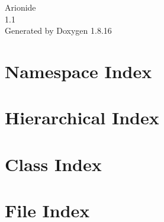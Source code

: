 \let\mypdfximage\pdfximage\def\pdfximage{\immediate\mypdfximage}\documentclass[twoside]{book}
\newcommand{\+}{\discretionary{\mbox{\scriptsize$\hookleftarrow$}}{}{}}
\newcommand{\clearemptydoublepage}{%
  \newpage{\pagestyle{empty}\cleardoublepage}%
}
\begin{document}
\hypersetup{pageanchor=false,
             bookmarksnumbered=true,
             pdfencoding=unicode
            }
\begin{titlepage}
\vspace*{7cm}
\begin{center}%
{\Large Arionide \\[1ex]\large 1.\+1 }\\
\vspace*{1cm}
{\large Generated by Doxygen 1.8.16}\\
\end{center}
\end{titlepage}
\clearemptydoublepage
{}
\tableofcontents
\clearemptydoublepage
{}
\hypersetup{pageanchor=true}

\chapter{Namespace Index}

\chapter{Hierarchical Index}

\chapter{Class Index}

\chapter{File Index}

\end{document}
